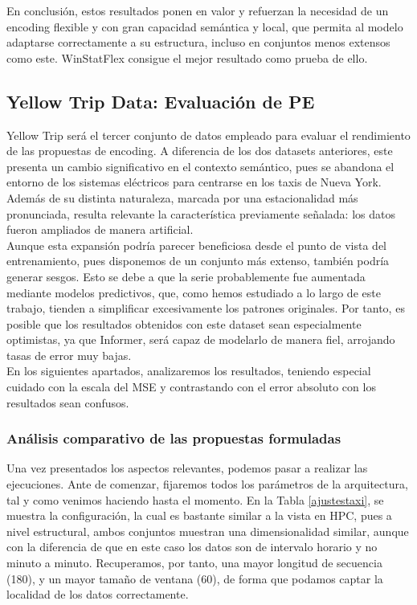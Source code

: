 En conclusión, estos resultados ponen en valor y refuerzan la necesidad de un encoding flexible y con gran capacidad semántica y local, que permita al modelo adaptarse correctamente a su estructura, incluso en conjuntos menos extensos como este. WinStatFlex consigue el mejor resultado como prueba de ello.

\subsection{Yellow Trip Data: Evaluación de PE}

Yellow Trip será el tercer conjunto de datos empleado para evaluar el rendimiento de las propuestas de encoding. A diferencia de los dos datasets anteriores, este presenta un cambio significativo en el contexto semántico, pues se abandona el entorno de los sistemas eléctricos para centrarse en los taxis de Nueva York. Además de su distinta naturaleza, marcada por una estacionalidad más pronunciada, resulta relevante la característica previamente señalada: los datos fueron ampliados de manera artificial. \\

Aunque esta expansión podría parecer beneficiosa desde el punto de vista del entrenamiento, pues disponemos de un conjunto más extenso, también podría generar sesgos. Esto se debe a que la serie probablemente fue aumentada mediante modelos predictivos, que, como hemos estudiado a lo largo de este trabajo, tienden a simplificar excesivamente los patrones originales. Por tanto, es posible que los resultados obtenidos con este dataset sean especialmente optimistas, ya que Informer, será capaz de modelarlo de manera fiel, arrojando tasas de error muy bajas.\\

En los siguientes apartados, analizaremos los resultados, teniendo especial cuidado con la escala del MSE y contrastando con el error absoluto con los resultados sean confusos.

\subsubsection{Análisis comparativo de las propuestas formuladas}

Una vez presentados los aspectos relevantes, podemos pasar a realizar las ejecuciones. Ante de comenzar, fijaremos todos los parámetros de la arquitectura, tal y como venimos haciendo hasta el momento. En la Tabla \ref{ajustestaxi}, se muestra la configuración, la cual es bastante similar a la vista en HPC, pues a nivel estructural, ambos conjuntos muestran una dimensionalidad similar, aunque con la diferencia de que en este caso los datos son de intervalo horario y no minuto a minuto. Recuperamos, por tanto, una mayor longitud de secuencia (180), y un mayor tamaño de ventana (60), de forma que podamos captar la localidad de los datos correctamente.

